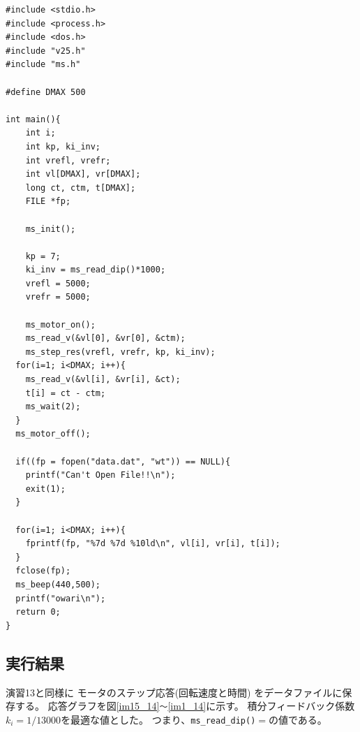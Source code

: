 \begin{lstlisting}[caption=演習14のプログラム,label=s14]
#include <stdio.h>
#include <process.h>
#include <dos.h>
#include "v25.h"
#include "ms.h"
 
#define DMAX 500
  
int main(){
    int i;
    int kp, ki_inv;
    int vrefl, vrefr;
    int vl[DMAX], vr[DMAX];
    long ct, ctm, t[DMAX];
    FILE *fp;
  
    ms_init();
  
    kp = 7;
    ki_inv = ms_read_dip()*1000;
    vrefl = 5000;
    vrefr = 5000;
  
    ms_motor_on();
    ms_read_v(&vl[0], &vr[0], &ctm);
    ms_step_res(vrefl, vrefr, kp, ki_inv);
  for(i=1; i<DMAX; i++){
    ms_read_v(&vl[i], &vr[i], &ct);
    t[i] = ct - ctm;
    ms_wait(2);
  }
  ms_motor_off();
  
  if((fp = fopen("data.dat", "wt")) == NULL){
    printf("Can't Open File!!\n");
    exit(1);
  }
  
  for(i=1; i<DMAX; i++){
    fprintf(fp, "%7d %7d %10ld\n", vl[i], vr[i], t[i]);
  }
  fclose(fp);
  ms_beep(440,500);
  printf("owari\n");
  return 0;
}
\end{lstlisting}

\subsection{実行結果}
演習13と同様に
モータのステップ応答(回転速度と時間)
をデータファイルに保存する。
応答グラフを図\ref{im15_14}\verb|～|\ref{im1_14}に示す。
積分フィードバック係数$k_i=1/13000$を最適な値とした。
つまり、\verb|ms_read_dip()|$=$の値である。

